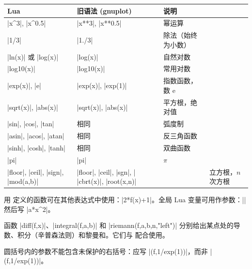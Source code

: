 \begin{center}
\begin{tabular}{lll}
\toprule
Lua & 旧语法 (gnuplot) & 说明 \\
\midrule
|x^3|, |x^0.5| & |x**3|, |x**0.5| & 幂运算 \\
|1/3| & |1./3| & 除法（始终为小数） \\
|ln(x)| 或 |log(x)| & |log(x)| & 自然对数 \\
|log10(x)| & |log10(x)| & 常用对数 \\
|exp(x)|, |e| & |exp(x)|, |exp(1)| & 指数函数，数 $\text{e}$ \\
|sqrt(x)|, |abs(x)| & |sqrt(x)|, |abs(x)| & 平方根，绝对值 \\
|sin|, |cos|, |tan| & 相同 & 弧度制 \\
|asin|, |acos|, |atan| & 相同 & 反三角函数 \\
|sinh|, |cosh|, |tanh| & 相同 & 双曲函数 \\
|pi| & |pi| & $\pi$ \\
|floor|, |ceil|, |sign|, |mod(a,b)| & |floor|, |ceil|, |sgn|, |%
|cbrt(x)|, |root(x,n)| & & 立方根，$n$ 次方根 \\
\bottomrule
\end{tabular}
\end{center}

\tkzHand 用  定义的函数可在其他表达式中使用：|2*f(x)+1|。全局 Lua 变量可用作参数：|| 然后写 |a*x^2|。

\tkzHand 函数 |diff(f,x)|、|integral(f,a,b)| 和 |riemann(f,a,b,n,"left")| 分别给出某点处的导数、积分（辛普森法则）和黎曼和。它们与  配合使用。

\tkzBomb 圆括号内的参数不能包含未保护的右括号：应写 |(f,{1/exp(1)})|，而非 |(f,1/exp(1))|。

\endinput
